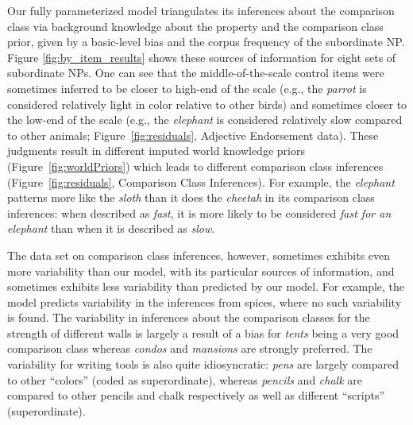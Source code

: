 \documentclass[doc, floatsintext]{apa6}
\begin{document}
Our fully parameterized model triangulates its inferences about the comparison class via background knowledge about the property and the comparison class prior, given by a basic-level bias and the corpus frequency of the subordinate NP. Figure \ref{fig:by_item_results} shows these sources of information for eight sets of subordinate NPs. 
One can see that the middle-of-the-scale control items were sometimes inferred to be closer to high-end of the scale (e.g., the \emph{parrot} is considered relatively light in color relative to other birds) and sometimes closer to the low-end of the scale (e.g., the \emph{elephant} is considered relatively slow compared to other animals; Figure~\ref{fig:residuals}, Adjective Endorsement data). These judgments result in different imputed  world knowledge priors (Figure~\ref{fig:worldPriors}) which leads to different comparison class inferences (Figure~\ref{fig:residuals}, Comparison Class Inferences). For example, the \emph{elephant} patterns more like the \emph{sloth} than it does the \emph{cheetah} in its comparison class inferences: when described as \emph{fast}, it is more likely to be considered \emph{fast for an elephant} than when it is described as \emph{slow}.

The data set on comparison class inferences, however, sometimes exhibits even more variability than our model, with its particular sources of information, and sometimes exhibits less variability than predicted by our model. 
For example, the model predicts variability in the inferences from spices, where no such variability is found. 
The variability in inferences about the comparison classes for the strength of different walls is largely a result of a bias for \emph{tents} being a very good comparison class whereas \emph{condos} and \emph{mansions} are strongly preferred.
The variability for writing tools is also quite idiosyncratic: \emph{pens} are largely compared to other ``colors'' (coded as superordinate), whereas \emph{pencils} and \emph{chalk} are compared to other pencils and chalk respectively as well as different ``scripts'' (superordinate). 

\end{document}
